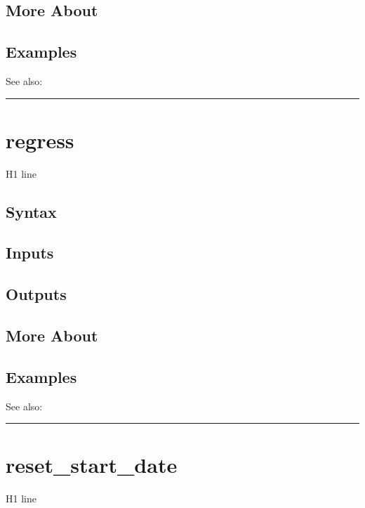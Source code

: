 \documentclass[letterpaper,10pt,english]{sphinxmanual}
\begin{document}
\subsection{More About}
\label{classes/time_series/@ts/ts:id485}

\subsection{Examples}
\label{classes/time_series/@ts/ts:id486}
See also:


\bigskip\hrule{}\bigskip



\section{regress}
\label{classes/time_series/@ts/ts:regress}\label{classes/time_series/@ts/ts:id487}
H1 line


\subsection{Syntax}
\label{classes/time_series/@ts/ts:id488}

\subsection{Inputs}
\label{classes/time_series/@ts/ts:id489}

\subsection{Outputs}
\label{classes/time_series/@ts/ts:id490}

\subsection{More About}
\label{classes/time_series/@ts/ts:id491}

\subsection{Examples}
\label{classes/time_series/@ts/ts:id492}
See also:


\bigskip\hrule{}\bigskip



\section{reset\_start\_date}
\label{classes/time_series/@ts/ts:id493}\label{classes/time_series/@ts/ts:reset-start-date}
H1 line
\end{document}
